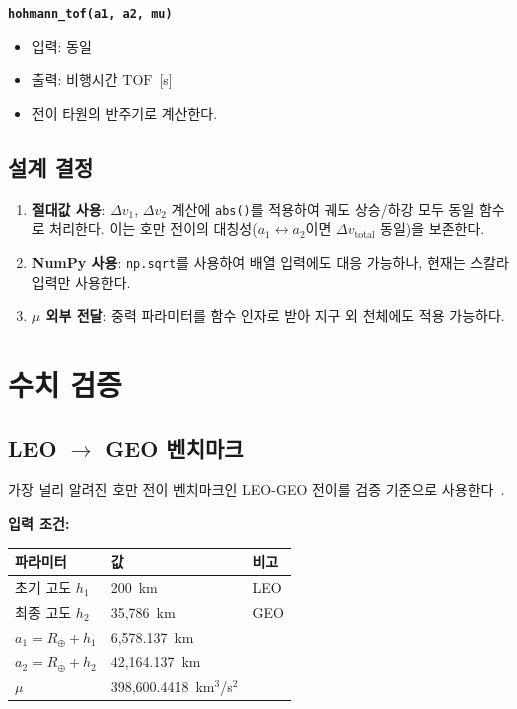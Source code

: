 \documentclass[11pt]{article}
\begin{document}
\textbf{\texttt{hohmann\_tof(a1, a2, mu)}}

\begin{itemize}[nosep]
\item 입력: 동일
\item 출력: 비행시간 $\text{TOF}$~[s]
\item 전이 타원의 반주기로 계산한다.
\end{itemize}

\subsection{설계 결정}

\begin{enumerate}[nosep]
\item \textbf{절대값 사용}: $\Delta v_1$, $\Delta v_2$ 계산에 \texttt{abs()}를 적용하여 궤도 상승/하강 모두 동일 함수로 처리한다. 이는 호만 전이의 대칭성($a_1 \leftrightarrow a_2$이면 $\Delta v_{\text{total}}$ 동일)을 보존한다.
\item \textbf{NumPy 사용}: \texttt{np.sqrt}를 사용하여 배열 입력에도 대응 가능하나, 현재는 스칼라 입력만 사용한다.
\item \textbf{$\mu$ 외부 전달}: 중력 파라미터를 함수 인자로 받아 지구 외 천체에도 적용 가능하다.
\end{enumerate}

\section{수치 검증}

\subsection{LEO $\rightarrow$ GEO 벤치마크}

가장 널리 알려진 호만 전이 벤치마크인 LEO-GEO 전이를 검증 기준으로 사용한다~\cite{Curtis2020}.

\textbf{입력 조건:}

\begin{table}[htbp]
\centering
\begin{tabular}{@{}lll@{}}
\toprule
파라미터 & 값 & 비고 \\
\midrule
초기 고도 $h_1$ & 200~km & LEO \\
최종 고도 $h_2$ & 35,786~km & GEO \\
$a_1 = R_\oplus + h_1$ & 6,578.137~km & \\
$a_2 = R_\oplus + h_2$ & 42,164.137~km & \\
$\mu$ & 398,600.4418~km$^3$/s$^2$ & \\
\bottomrule
\end{tabular}
\end{table}
\end{document}
